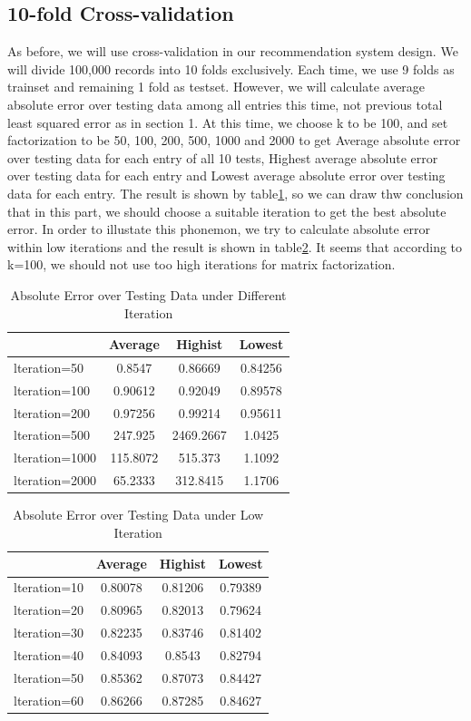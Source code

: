 \documentclass{article}
\begin{document}
\subsection{10-fold Cross-validation}
As before, we will use cross-validation in our recommendation system design. We will divide 100,000 records into 10 folds exclusively. Each time, we use 9 folds as trainset and remaining 1 fold as testset. However, we will calculate average absolute error over testing data among all entries this time, not previous total least squared error as in section 1. At this time, we choose k to be 100, and set factorization to be 50, 100, 200, 500, 1000 and 2000 to get Average absolute error over testing data for each entry of all 10 tests, Highest average absolute error over testing data for each entry and Lowest average absolute error over testing data for each entry. The result is shown by table\ref{tb:p2}, so we can draw thw conclusion that in this part, we should choose a suitable iteration to get the best absolute error. In order to illustate this phonemon, we try to calculate absolute error within low iterations and the result is shown in table\ref{tb:p22}. It seems that according to k=100, we should not use too high iterations for matrix factorization.
\begin{table}
\begin{center}
\caption{Absolute Error over Testing Data under Different Iteration}
\label{tb:p2}
\begin{tabular}{|l||c|c|c|}
\hline
 & Average& Highist & Lowest\\
\hline
lteration=50&0.8547&0.86669&0.84256\\
lteration=100&0.90612&0.92049&0.89578\\
lteration=200&0.97256&0.99214&0.95611\\
lteration=500&247.925&2469.2667&1.0425\\
lteration=1000&115.8072&515.373&1.1092\\
lteration=2000&65.2333&312.8415&1.1706\\
\hline
\end{tabular}
\end{center}
\end{table}

\begin{table}
\begin{center}
\caption{Absolute Error over Testing Data under Low Iteration}
\label{tb:p22}
\begin{tabular}{|l||c|c|c|}
\hline
 & Average& Highist & Lowest\\
\hline
lteration=10&0.80078&0.81206&0.79389\\
lteration=20&0.80965&0.82013&0.79624\\
lteration=30&0.82235&0.83746&0.81402\\
lteration=40&0.84093&0.8543&0.82794\\
lteration=50&0.85362&0.87073&0.84427\\
lteration=60&0.86266&0.87285&0.84627\\
\hline
\end{tabular}
\end{center}
\end{table}
\end{document}
